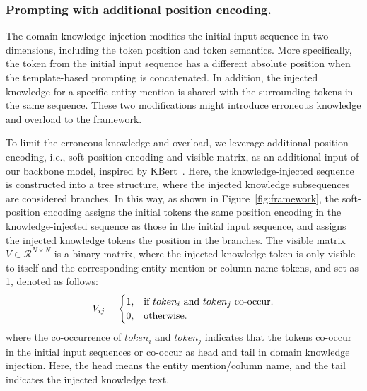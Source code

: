 
\subsubsection{Prompting with additional position encoding.}
The domain knowledge injection modifies the initial input sequence in two dimensions, including the token position and token semantics. More specifically, the token from the initial input sequence has a different absolute position when the template-based prompting is concatenated. In addition, the injected knowledge for a specific entity mention is shared with the surrounding tokens in the same sequence. These two modifications might introduce erroneous knowledge and overload to the framework. 

To limit the erroneous knowledge and overload, we leverage additional position encoding, i.e., soft-position encoding and visible matrix, as an additional input of our backbone model, inspired by K\-Bert~\cite{liu_k-bert_2020}. Here, the knowledge-injected sequence is constructed into a tree structure, where the injected knowledge subsequences are considered branches. In this way, as shown in Figure~\ref{fig:framework}, the soft-position encoding assigns the initial tokens the same position encoding in the knowledge-injected sequence as those in the initial input sequence, and assigns the injected knowledge tokens the position in the branches. The visible matrix $V\in \mathcal{R}^{N \times N}$ is a binary matrix, where the injected knowledge token is only visible to itself and the corresponding entity mention or column name tokens, and set as 1, denoted as follows:
\begin{equation}
    V_{ij} = \begin{cases}
    1, & \text{if $token_i$ \text{and} $token_j$ co-occur}.\\
    0, & \text{otherwise}.
  \end{cases}
  \label{Eq:VM}
\end{equation}
where the co-occurrence of $token_i$ and $token_j$ indicates that the tokens co-occur in the initial input sequences or co-occur as head and tail in domain knowledge injection. Here, the head means the entity mention/column name, and the tail indicates the injected knowledge text. 
